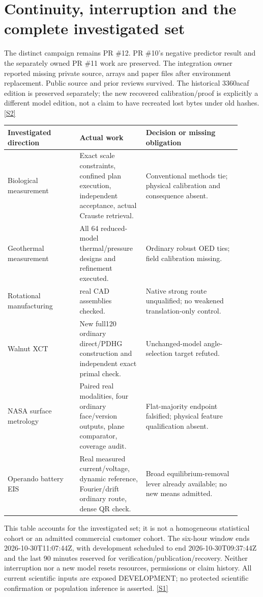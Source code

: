 \documentclass[11pt,letterpaper]{article}
\begin{document}
\section{Continuity, interruption and the complete investigated set}
The distinct campaign remains PR \#12. PR \#10's negative predictor result and the separately owned PR \#11 work are preserved. The integration owner reported missing private source, arrays and paper files after environment replacement. Public source and prior reviews survived. The historical 3360acaf edition is preserved separately; the new recovered calibration/proof is explicitly a different model edition, not a claim to have recreated lost bytes under old hashes. \href{https://github.com/MontrealAI/AGI-Alpha-Invention-Flywheel-Lab/blob/2b7a58e6e6593ae48da6f7f33865db94868c957f/evidence/overnight-008/recovery-0719/INTERRUPTION.json}{[S2]}\par
\begingroup\small\begin{longtable}{>{\raggedright\arraybackslash}p{0.29\linewidth}>{\raggedright\arraybackslash}p{0.25\linewidth}>{\raggedright\arraybackslash}p{0.37\linewidth}}\toprule
\textbf{Investigated direction} & \textbf{Actual work} & \textbf{Decision or missing obligation}\\\midrule\endhead
Biological measurement & Exact scale constraints, confined plan execution, independent acceptance, actual Crauste retrieval. & Conventional methods tie; physical calibration and consequence absent.\\
Geothermal measurement & All 64 reduced-model thermal/pressure designs and refinement executed. & Ordinary robust OED ties; field calibration missing.\\
Rotational manufacturing & 24 real CAD assemblies checked. & Native strong route unqualified; no weakened translation-only control.\\
Walnut XCT & New full120 ordinary direct/PDHG construction and independent exact primal check. & Unchanged-model angle-selection target refuted.\\
NASA surface metrology & Paired real modalities, four ordinary face/version outputs, plane comparator, coverage audit. & Flat-majority endpoint falsified; physical feature qualification absent.\\
Operando battery EIS & Real measured current/voltage, dynamic reference, Fourier/drift ordinary route, dense QR check. & Broad equilibrium-removal lever already available; no new means admitted.\\
\bottomrule\end{longtable}\endgroup
This table accounts for the investigated set; it is not a homogeneous statistical cohort or an admitted commercial customer cohort. The six-hour window ends 2026-10-30T11:07:44Z, with development scheduled to end 2026-10-30T09:37:44Z and the last 90 minutes reserved for verification/publication/recovery. Neither interruption nor a new model resets resources, permissions or claim history. All current scientific inputs are exposed DEVELOPMENT; no protected scientific confirmation or population inference is asserted. \href{https://github.com/MontrealAI/AGI-Alpha-Invention-Flywheel-Lab/blob/2b7a58e6e6593ae48da6f7f33865db94868c957f/campaign/overnight-008/ALLOCATION.json}{[S1]}\par
\end{document}
